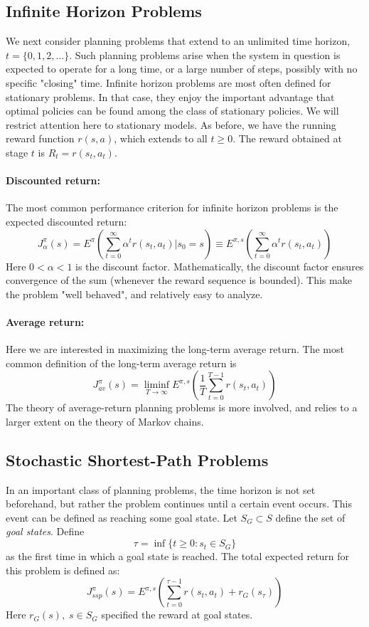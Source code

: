 \subsection{Infinite Horizon Problems}
We next consider planning problems that extend to an unlimited time horizon, $t = \{0,1,2, \ldots \}$. Such planning problems arise when the system in question is expected to operate for a long time, or a large number of steps, possibly with no specific "closing" time.
Infinite horizon problems are most often defined for stationary problems. In that case, they enjoy the important advantage that optimal policies can be found among the class of stationary policies.  We will restrict attention here to stationary models.
As before, we have the running reward function $r(s,a)$, which extends to all $t \ge 0$. The reward obtained at stage $t$ is  ${R_t} = r({s_t},{a_t})$.

\paragraph{Discounted return:} The most common performance criterion for infinite horizon problems is the expected discounted return:
\[J_\alpha ^\pi (s) = {E^\pi }\left(\sum\limits_{t = 0}^\infty  {{\alpha ^t}r({s_t},{a_t})} |{s_0} = s\right) \equiv {E^{\pi ,s}}\left(\sum\limits_{t = 0}^\infty  {{\alpha ^t}r({s_t},{a_t})} \right)\]
Here $0 < \alpha  < 1$ is the discount factor. Mathematically, the discount factor ensures convergence of the sum (whenever the reward sequence is bounded). This make the problem "well behaved", and relatively easy to analyze.
\paragraph{Average return:}  Here we are interested in maximizing the long-term average return. The most common definition of the long-term average return is
\[J_{av}^\pi (s) = \mathop {\lim \inf }\limits_{T \to \infty } {E^{\pi ,s}}\left(\frac{1}{T}\sum\limits_{t = 0}^{T - 1} {r({s_t},{a_t})} \right)\]
The theory of average-return planning problems is more involved, and relies to a larger extent on the theory of Markov chains.


\subsection{Stochastic Shortest-Path Problems}
In an important class of planning problems, the time horizon is not set beforehand, but rather the problem continues until a certain event occurs. This event can be defined as reaching some goal state.
Let  ${S_G} \subset S$ define the set of \emph{goal states}. Define
\[\tau  = \inf \{ t \ge 0:{s_t} \in {S_G}\} \]
as the first time in which a goal state is reached. The total expected return for this problem is defined as:
\[J_{ssp}^\pi (s) = {E^{\pi ,s}}\left(\sum\limits_{t = 0}^{\tau  - 1} {r({s_t},{a_t})}  + {r_G}({s_\tau })\right)\]
Here ${r_G}(s),\;s \in {S_G}$ specified the reward at goal states.

